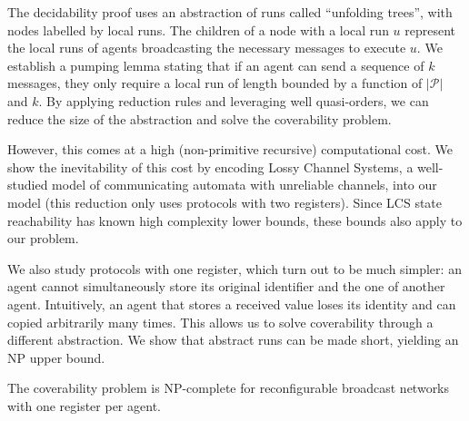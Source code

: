 \documentclass{article}
\newcommand{\size}[1]{|#1|}
\theoremstyle{definition}
\begin{document}
The decidability proof uses an abstraction of runs called ``unfolding trees'', with nodes labelled by local runs. The children of a node with a local run $u$ represent the local runs of agents broadcasting the necessary messages to execute $u$.
We establish a pumping lemma stating that if an agent can send a sequence of $k$ messages, they only require a local run of length bounded by a function of $\size{\mathcal{P}}$ and $k$.
By applying reduction rules and leveraging well quasi-orders, we can reduce the size of the abstraction and solve the coverability problem. 

However, this comes at a high (non-primitive recursive) computational cost. We show the inevitability of this cost by encoding Lossy Channel Systems, a well-studied model of communicating automata with unreliable channels, into our model (this reduction only uses protocols with two registers).
Since LCS state reachability has known high complexity lower bounds, these bounds also apply to our problem.
	
	
	We also study protocols with one register, which turn out to be much simpler: an agent cannot simultaneously store its original identifier and the one of another agent. Intuitively, an agent that stores a received value loses its identity and can copied arbitrarily many times.
	This allows us to solve coverability through a different abstraction. We show that abstract runs can be made short, yielding an NP upper bound.
	
	\begin{theorem}
		The coverability problem is NP-complete for reconfigurable broadcast networks with one register per agent.
	\end{theorem}
	
\end{document}
